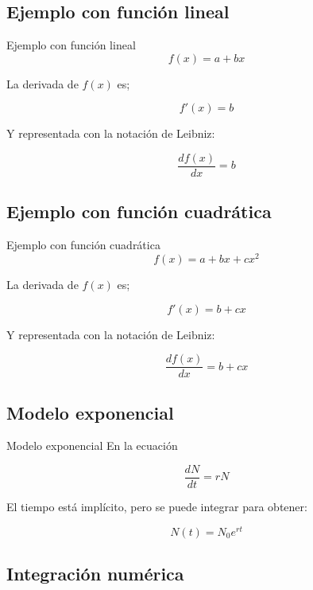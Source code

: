 \documentclass[
  11pt,
  ignorenonframetext,
]{beamer}
\begin{document}
\hypertarget{ejemplo-con-funciuxf3n-lineal}{%
\subsection{Ejemplo con función
lineal}\label{ejemplo-con-funciuxf3n-lineal}}

\begin{frame}{Ejemplo con función lineal}
\[f(x) = a + bx\]

La derivada de \(f(x)\) es;

\[f'(x) = b\]

Y representada con la notación de Leibniz:

\[\frac{df(x)}{dx} = b\]
\end{frame}

\hypertarget{ejemplo-con-funciuxf3n-cuadruxe1tica}{%
\subsection{Ejemplo con función
cuadrática}\label{ejemplo-con-funciuxf3n-cuadruxe1tica}}

\begin{frame}{Ejemplo con función cuadrática}
\[f(x) = a + bx + cx^2\]

La derivada de \(f(x)\) es;

\[f'(x) = b + cx\]

Y representada con la notación de Leibniz:

\[\frac{df(x)}{dx} = b + cx\]
\end{frame}

\hypertarget{modelo-exponencial}{%
\subsection{Modelo exponencial}\label{modelo-exponencial}}

\begin{frame}{Modelo exponencial}
En la ecuación

\[\frac{dN}{dt} = r N\]

El tiempo está implícito, pero se puede integrar para obtener:

\[N(t) = N_0 e^{rt}\]
\end{frame}

\hypertarget{integraciuxf3n-numuxe9rica}{%
\subsection{Integración numérica}\label{integraciuxf3n-numuxe9rica}}
\end{document}
